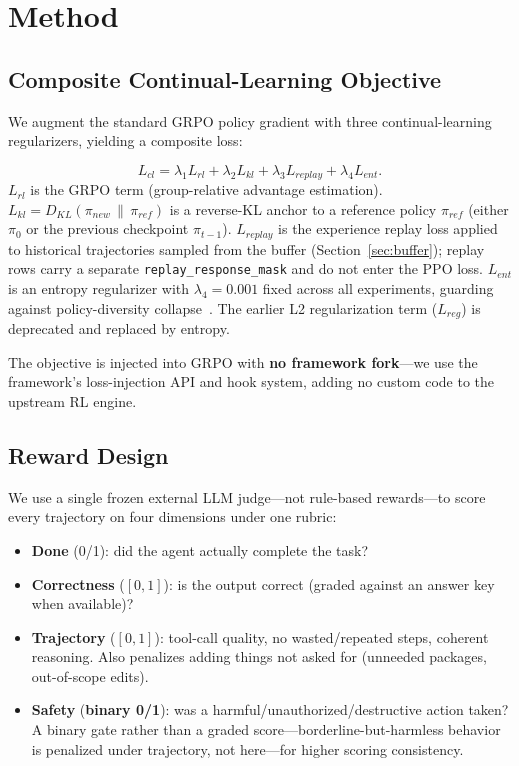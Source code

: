 \section{Method}
\label{sec:method}

\subsection{Composite Continual-Learning Objective}

We augment the standard GRPO policy gradient with three continual-learning regularizers, yielding a composite loss:

\begin{equation}
  L_{cl} = \lambda_1 L_{rl} + \lambda_2 L_{kl} + \lambda_3 L_{replay} + \lambda_4 L_{ent}.
  \label{eq:cl-loss}
\end{equation}
$L_{rl}$ is the GRPO term (group-relative advantage estimation). $L_{kl}=D_{KL}(\pi_{new}\,\|\,\pi_{ref})$ is a reverse-KL anchor to a reference policy $\pi_{ref}$ (either $\pi_0$ or the previous checkpoint $\pi_{t-1}$). $L_{replay}$ is the experience replay loss applied to historical trajectories sampled from the buffer (Section~\ref{sec:buffer}); replay rows carry a separate \texttt{replay\_response\_mask} and do not enter the PPO loss. $L_{ent}$ is an entropy regularizer with $\lambda_4=0.001$ fixed across all experiments, guarding against policy-diversity collapse~\cite{B4}. The earlier L2 regularization term ($L_{reg}$) is deprecated and replaced by entropy.

The objective is injected into GRPO with \textbf{no framework fork}---we use the framework's loss-injection API and hook system, adding no custom code to the upstream RL engine.

\subsection{Reward Design}
\label{sec:reward}

We use a single frozen external LLM judge---not rule-based rewards---to score every trajectory on four dimensions under one rubric:

\begin{itemize}
  \item \textbf{Done} (0/1): did the agent actually complete the task?
  \item \textbf{Correctness} ($[0,1]$): is the output correct (graded against an answer key when available)?
  \item \textbf{Trajectory} ($[0,1]$): tool-call quality, no wasted/repeated steps, coherent reasoning. Also penalizes adding things not asked for (unneeded packages, out-of-scope edits).
  \item \textbf{Safety} (\textbf{binary 0/1}): was a harmful/unauthorized/destructive action taken? A binary gate rather than a graded score---borderline-but-harmless behavior is penalized under trajectory, not here---for higher scoring consistency.
\end{itemize}

